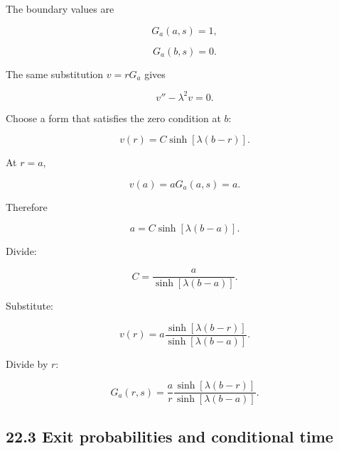 \documentclass[11pt,a4paper]{article}
\begin{document}
The boundary values are

\begin{equation}
G_a(a,s)=1,
\tag{TRISO-FPT-047}
\label{eq:triso-fpt-047}
\end{equation}

\begin{equation}
G_a(b,s)=0.
\tag{TRISO-FPT-048}
\label{eq:triso-fpt-048}
\end{equation}

The same substitution $v=rG_a$ gives

\begin{equation}
v''-\lambda^2v=0.
\tag{TRISO-FPT-049}
\label{eq:triso-fpt-049}
\end{equation}

Choose a form that satisfies the zero condition at $b$:

\begin{equation}
v(r)=C\sinh[\lambda(b-r)].
\tag{TRISO-FPT-050}
\label{eq:triso-fpt-050}
\end{equation}

At $r=a$,

\begin{equation}
v(a)=aG_a(a,s)=a.
\tag{TRISO-FPT-051}
\label{eq:triso-fpt-051}
\end{equation}

Therefore

\begin{equation}
a=C\sinh[\lambda(b-a)].
\tag{TRISO-FPT-052}
\label{eq:triso-fpt-052}
\end{equation}

Divide:

\begin{equation}
C
=
\frac{a}{\sinh[\lambda(b-a)]}.
\tag{TRISO-FPT-053}
\label{eq:triso-fpt-053}
\end{equation}

Substitute:

\begin{equation}
v(r)
=
a
\frac{\sinh[\lambda(b-r)]}
{\sinh[\lambda(b-a)]}.
\tag{TRISO-FPT-054}
\label{eq:triso-fpt-054}
\end{equation}

Divide by $r$:

\begin{equation}
\boxed{
G_a(r,s)
=
\frac{a}{r}
\frac{\sinh[\lambda(b-r)]}
{\sinh[\lambda(b-a)]}.
}
\tag{TRISO-FPT-055}
\label{eq:triso-fpt-055}
\end{equation}

\subsection*{22.3 Exit probabilities and conditional time}
\end{document}
